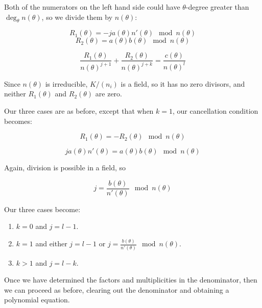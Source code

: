Both of the numerators on the left hand side could have $\theta$-degree greater than $\deg_\theta n(\theta)$,
so we divide them by $n(\theta)$:



$$R_1(\theta) = -ja(\theta)n'(\theta) \mod n(\theta)$$
$$R_2(\theta) = a(\theta)b(\theta) \mod n(\theta)$$



$$\frac{R_1(\theta)}{n(\theta)^{j+1}} + \frac{R_2(\theta)}{n(\theta)^{j+k}} = \frac{c(\theta)}{n(\theta)^l}$$


Since $n(\theta)$ is irreducible, $K/(n_i)$ is a field, so it has no zero divisors, and
neither $R_1(\theta)$ and $R_2(\theta)$ are zero.

Our three cases are as before, except that when $k=1$, our cancellation condition becomes:

$$R_1(\theta) = -R_2(\theta) \mod n(\theta)$$

$$ja(\theta)n'(\theta) = a(\theta)b(\theta) \mod n(\theta)$$

Again, division is possible in a field, so

$$j = \frac{b(\theta)}{n'(\theta)} \mod n(\theta)$$

Our three cases become:

\begin{enumerate}

\item $k=0$ and $j = l-1$.

\item $k=1$ and either $j=l-1$ or $j = \frac{b(\theta)}{n'(\theta)} \mod n(\theta)$.

\item $k>1$ and $j=l-k$.

\end{enumerate}

Once we have determined the factors and multiplicities in the denominator,
then we can proceed as before, clearing out the denominator and obtaining
a polynomial equation.

\vfill\eject

